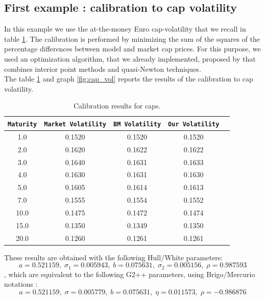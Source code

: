 \documentclass[12pt,a4paper]{article}
\begin{document}
\subsection{First example : calibration to cap volatility}

In this example we use the at-the-money Euro cap-volatility that we recall in table \ref{''cap''}. The calibration is performed by minimizing the sum of the squares of the percentage differences between model and market cap prices. For this purpose, we used an optimization algorithm, that we already implemented, proposed by \cite{BFGS} that combines interior point methods and quasi-Newton techniques.\\

The table \ref{''cap''} and graph \ref{fig:cap_vol} reports the results of the calibration to cap volatility.

\begin{table}[''h'']
   \centering
    \begin{tabular}{|c|c|c|c|c|}
    \hline
      \texttt{Maturity} & \texttt{Market Volatility} & \texttt{BM Volatility}& \texttt{Our Volatility}\\
    \hline
1.0   & 0.1520 & 0.1520 & 0.1520 \\ 
2.0   & 0.1620 & 0.1622 & 0.1622 \\ 
3.0   & 0.1640 & 0.1631 & 0.1633 \\ 
4.0   & 0.1630 & 0.1631 & 0.1630 \\ 
5.0   & 0.1605 & 0.1614 & 0.1613 \\ 
7.0   & 0.1555 & 0.1554 & 0.1552 \\ 
10.0  & 0.1475 & 0.1472 & 0.1474 \\ 
15.0  & 0.1350 & 0.1349 & 0.1350 \\ 
20.0  & 0.1260 & 0.1261 & 0.1261 \\ 
    \hline
\end{tabular}
\caption{\label{''cap''} Calibration results for caps. }
\end{table}

These results are obtained with the following Hull/White parameters: 
$$a = 0.521159,\; \sigma_1 = 0.005943,\; b = 0.075631,\;  \sigma_2 = 0.005156,\; \rho = 0.987593 $$
, which are equivalent to the following G2++ parameters, using Brigo/Mercurio notations :
$$a = 0.521159,\; \sigma = 0.005779,\; b = 0.075631,\;  \eta = 0.011573,\; \rho = -0.986876 $$
\end{document}
